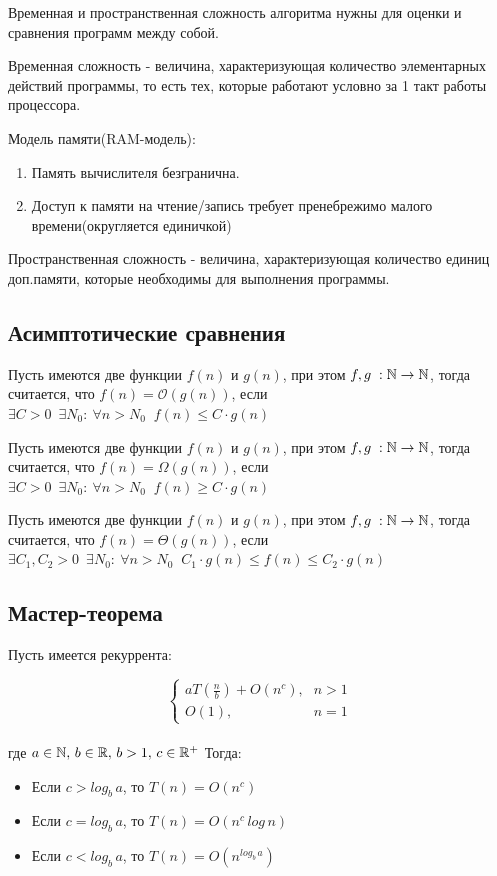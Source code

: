 Временная и пространственная сложность алгоритма нужны для оценки и сравнения программ между собой. 

\Def Временная сложность - величина, характеризующая количество элементарных действий программы, то есть тех, которые работают условно за 1 такт работы процессора. 

Модель памяти(RAM-модель):
\begin{enumerate}
    \item Память вычислителя безгранична.
    \item Доступ к памяти на чтение/запись требует пренебрежимо малого времени(округляется единичкой)
\end{enumerate}

\Def Пространственная сложность - величина, характеризующая количество единиц доп.памяти, которые необходимы для выполнения программы.

\subsection*{Асимптотические сравнения}

\Def Пусть имеются две функции $f(n)$  и $g(n)$, при этом $f, g \; : \mathbb{N} \rightarrow \mathbb{N}$,
тогда считается, что $f(n) = \mathcal{O} (g(n))$, если $\exists C > 0 \; \ \exists N_{0}: \ \forall n > N_{0} \; \; f(n) \leqslant C \cdot g(n)$

\Def Пусть имеются две функции $f(n)$  и $g(n)$, при этом $f, g \; : \mathbb{N} \rightarrow \mathbb{N}$,
тогда считается, что $f(n) = \Omega (g(n))$, если $\exists C > 0 \; \ \exists N_{0}: \ \forall n > N_{0} \; \; f(n) \geqslant C \cdot g(n)$

\Def Пусть имеются две функции $f(n)$  и $g(n)$, при этом $f, g \; : \mathbb{N} \rightarrow \mathbb{N}$,
тогда считается, что $f(n) = \Theta (g(n))$, если $\exists C_{1}, C_{2} > 0 \; \ \exists N_{0}: \ \forall n > N_{0} \; \; C_{1} \cdot g(n) \leqslant f(n) \leqslant C_{2} \cdot g(n)$

\subsection*{Мастер-теорема}

\Thbd Пусть имеется рекуррента:

$$\begin{cases}
aT(\frac{n}{b}) + O(n^c)\text{,} & n > 1\\
O(1), & n = 1
\end{cases}$$\\
где $a \in \mathbb{N},\,b \in \mathbb{R},\,b > 1,\,c \in \mathbb{R}^{+}$
Тогда:
\begin{itemize}
    \item Если $c > log_b\,a$, то $T(n) = O(n^c)$
    \item Если $c = log_b\,a$, то $T(n) = O(n^c\,log\,n)$
    \item Если $c < log_b\,a$, то $T(n) = O(n ^ {log_b\,a})$
\end{itemize}

\pagebreak